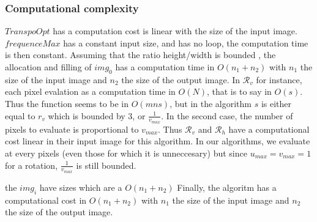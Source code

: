    \subsubsection{Computational complexity}
   
 $TranspoOpt$ has a computation cost is linear with the size of the input image. $frequenceMax$ has a constant input size, and has no loop, the computation time is then constant. Assuming that the ratio height/width is bounded , the allocation and filling of $img_0$ has a computation time in $O(n_1+n_2)$ with $n_1$ the size of the input image and $n_2$ the size of the output image.
  In ${\mathcal R}_v$ for instance, each pixel evalation as a computation time in $O(N)$, that is to say in $O(s)$. Thus the function seems to be in $O(mns)$, but in the algorithm $s$ is either equal to $r_v$ which is bounded by $3$, or $\frac{1}{v_{max}}$. In the second case, the number of pixels to evaluate is proportional to $v_{max}$. Thus ${\mathcal R}_v$ and ${\mathcal R}_h$ have a computational cost linear in their input image for this algorithm. In our algorithms, we evaluate at every pixels (even those for which it is unneccesary) but since $u_{max} = v_{max} = 1$ for a rotation, $\frac{1}{v_{max}}$ is still bounded.

   
    the $img_i$ have sizes which are a $O(n_1+n_2)$
   \medbreak
   Finally, the algoritm has a computational cost in $O(n_1+n_2)$ with $n_1$ the size of the input image and $n_2$ the size of the output image.
